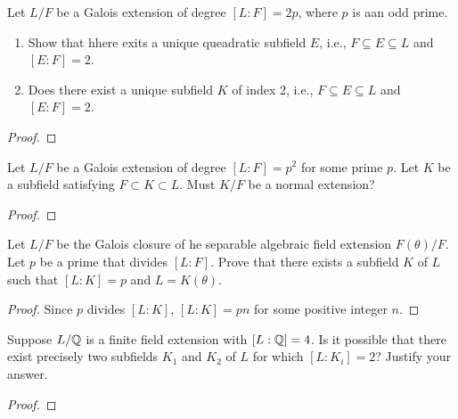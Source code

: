 \begin{problem}
  Let $L/F$ be a Galois extension of degree
  $[L:F]=2p$, where $p$ is aan odd prime.
  \begin{enumerate}[label=(\alph*)]
  \item Show that hhere exits a unique queadratic subfield $E$,
    i.e., $F\subseteq E\subseteq L$ and $[E:F]=2$.
  \item Does there exist a unique subfield $K$ of index $2$,
    i.e., $F\subseteq E\subseteq L$ and $[E:F]=2$.
  \end{enumerate}
\begin{proof}
\end{proof}
\end{problem}

\begin{problem}
  Let $L/F$ be a Galois extension of degree $[L:F]=p^2$ for some
  prime $p$. Let $K$ be a subfield satisfying
  $F\subset K\subset L$. Must $K/F$ be a normal extension?
\begin{proof}
\end{proof}
\end{problem}

\begin{problem}
  Let $L/F$ be the Galois closure of he separable algebraic field
  extension $F(\theta)/F$. Let $p$ be a prime that divides
  $[L:F]$. Prove that there exists a subfield $K$ of $L$ such
  that $[L:K]=p$ and $L=K(\theta)$.
\end{problem}
\begin{proof}
  Since $p$ divides $[L:K]$, $[L:K]=pn$ for some positive integer
  $n$.
\end{proof}
\begin{problem}
  Suppose $L/\mathbb{Q}$ is a finite field extension with
  $[L:\mathbb{Q}]=4$. Is it possible that there exist precisely two
  subfields $K_1$ and $K_2$ of $L$ for which $[L:K_i]=2$? Justify
  your answer.
\begin{proof}
\end{proof}
\end{problem}

